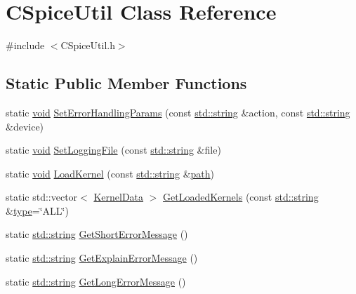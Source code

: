 \hypertarget{class_c_spice_util}{\section{C\+Spice\+Util Class Reference}
\label{class_c_spice_util}
}


{\ttfamily \#include $<$C\+Spice\+Util.\+h$>$}

\subsection*{Static Public Member Functions}
\begin{DoxyCompactItemize}
\item 
static \hyperlink{wglext_8h_a9e6b7f1933461ef318bb000d6bd13b83}{void} \hyperlink{class_c_spice_util_a1bc23133b0aa142ccc71d5fd85d0e609}{Set\+Error\+Handling\+Params} (const \hyperlink{glext_8h_ae84541b4f3d8e1ea24ec0f466a8c568b}{std\+::string} \&action, const \hyperlink{glext_8h_ae84541b4f3d8e1ea24ec0f466a8c568b}{std\+::string} \&device)
\item 
static \hyperlink{wglext_8h_a9e6b7f1933461ef318bb000d6bd13b83}{void} \hyperlink{class_c_spice_util_af1b073c99197ec2a2d22772e3a86d30d}{Set\+Logging\+File} (const \hyperlink{glext_8h_ae84541b4f3d8e1ea24ec0f466a8c568b}{std\+::string} \&file)
\item 
static \hyperlink{wglext_8h_a9e6b7f1933461ef318bb000d6bd13b83}{void} \hyperlink{class_c_spice_util_a0940aa96ffa3ef14f0ea2510c4163710}{Load\+Kernel} (const \hyperlink{glext_8h_ae84541b4f3d8e1ea24ec0f466a8c568b}{std\+::string} \&\hyperlink{glext_8h_ab25d8cd967ccbd19b630d7100ff8f67e}{path})
\item 
static std\+::vector$<$ \hyperlink{struct_kernel_data}{Kernel\+Data} $>$ \hyperlink{class_c_spice_util_a596f67731f91d55c8bb9b57e9ccb9c3d}{Get\+Loaded\+Kernels} (const \hyperlink{glext_8h_ae84541b4f3d8e1ea24ec0f466a8c568b}{std\+::string} \&\hyperlink{glext_8h_ab7c1afc09f67635c2c376638fcc0db5f}{type}=\char`\"{}A\+L\+L\char`\"{})
\item 
static \hyperlink{glext_8h_ae84541b4f3d8e1ea24ec0f466a8c568b}{std\+::string} \hyperlink{class_c_spice_util_aeb94a04c72d380e3d2ed82b93ea2ab8f}{Get\+Short\+Error\+Message} ()
\item 
static \hyperlink{glext_8h_ae84541b4f3d8e1ea24ec0f466a8c568b}{std\+::string} \hyperlink{class_c_spice_util_a9f5342e5699102d1f8ab772c43229a1c}{Get\+Explain\+Error\+Message} ()
\item 
static \hyperlink{glext_8h_ae84541b4f3d8e1ea24ec0f466a8c568b}{std\+::string} \hyperlink{class_c_spice_util_a22c2279dc23954b16e54261cad31ed9f}{Get\+Long\+Error\+Message} ()

\end{DoxyCompactItemize}
